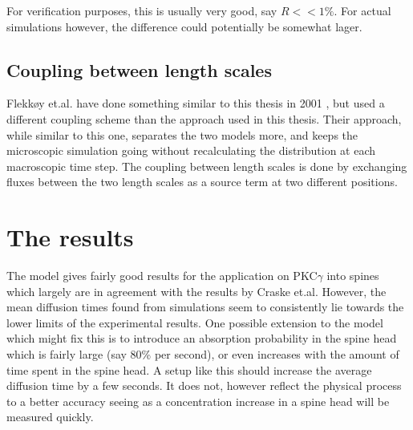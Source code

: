 For verification purposes, this is usually very good, say $R<<1\%$. For actual simulations however, the difference could potentially be somewhat lager.

\subsection{Coupling between length scales}
Flekkøy et.al. have done something similar to this thesis in 2001 \cite{flekkoy2001coupling}, but used a different coupling scheme than the approach used in this thesis. 
Their approach, while similar to this one, separates the two models more, and keeps the microscopic simulation going without recalculating the distribution at each macroscopic time step. 
The coupling between length scales is done by  exchanging fluxes between the two length scales as a source term at two different positions. 


\section{The results}\label{discussion:results}

The model gives fairly good results for the application on PKC$\gamma$ into spines which largely are in agreement with the results by Craske et.al. 
However, the mean diffusion times found from simulations seem to consistently lie towards the lower limits of the experimental results. 
One possible extension to the model which might fix this is to introduce an absorption probability in the spine head which is fairly large (say 80\% per second), or even increases with the amount of time spent in the spine head. 
A setup like this should increase the average diffusion time by a few seconds. 
It does not, however reflect the physical process to a better accuracy seeing as a concentration increase in a spine head will be measured quickly.